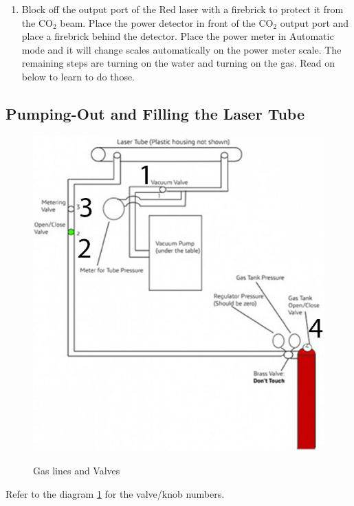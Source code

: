 \documentclass{../lab}
\begin{document}
\begin{enumerate}
    \item Block off the output port of the Red laser with a firebrick to protect it from the CO$_2$ beam. Place the power detector in front of the CO$_2$ output port and place a firebrick behind the detector. Place the power meter in Automatic mode and it will change scales automatically on the power meter scale. The remaining steps are turning on the water and turning on the gas. Read on below to learn to do those.

\end{enumerate}

\subsection{Pumping-Out and Filling the Laser Tube}

\begin{figure}[h]
    \centering
    \href{http://experimentationlab.berkeley.edu/sites/default/files/CO-2/lasergaspic_large.jpg}{\includegraphics[width=0.5\linewidth]{images/lasergaspic_large.jpg}}
    \caption{Gas lines and Valves}
    \label{fig:GasLinesAndValves}
\end{figure}
 
Refer to the diagram \ref{fig:GasLinesAndValves} for the valve/knob numbers.

\newpage
\end{document}
